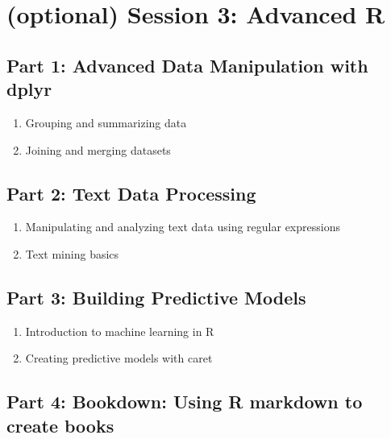 \documentclass[
]{book}
\providecommand{\tightlist}{%
  \setlength{\itemsep}{0pt}\setlength{\parskip}{0pt}}
\begin{document}
\section*{(optional) Session 3: Advanced R}\label{optional-session-3-advanced-r}

\subsection*{Part 1: Advanced Data Manipulation with dplyr}\label{part-1-advanced-data-manipulation-with-dplyr}

\begin{enumerate}
\def\labelenumi{\arabic{enumi}.}
\tightlist
\item
  Grouping and summarizing data
\item
  Joining and merging datasets
\end{enumerate}

\subsection*{Part 2: Text Data Processing}\label{part-2-text-data-processing}

\begin{enumerate}
\def\labelenumi{\arabic{enumi}.}
\tightlist
\item
  Manipulating and analyzing text data using regular expressions
\item
  Text mining basics
\end{enumerate}

\subsection*{Part 3: Building Predictive Models}\label{part-3-building-predictive-models}

\begin{enumerate}
\def\labelenumi{\arabic{enumi}.}
\tightlist
\item
  Introduction to machine learning in R
\item
  Creating predictive models with caret
\end{enumerate}

\subsection*{Part 4: Bookdown: Using R markdown to create books}\label{part-4-bookdown-using-r-markdown-to-create-books}
\end{document}
